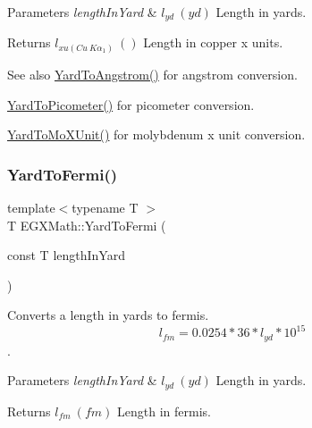 \begin{DoxyParams}{Parameters}
{\em length\+In\+Yard} & $ l_{yd}\ (yd)$ Length in yards. \\
\hline
\end{DoxyParams}
\begin{DoxyReturn}{Returns}
$ l_{xu(Cu\ K\alpha_1)}\ ()$ Length in copper x units. 
\end{DoxyReturn}
\begin{DoxySeeAlso}{See also}
\mbox{\hyperlink{group___e_g_x_math-_conversions-_length_conversions-_imperial-_yard-_non-_s_i_gaacff083bdc6b954da2e4b63f857cb429}{Yard\+To\+Angstrom()}} for angstrom conversion. 

\mbox{\hyperlink{group___e_g_x_math-_conversions-_length_conversions-_imperial-_yard-_s_i_ga1d0bc498fe3ed1693555aa6917abb758}{Yard\+To\+Picometer()}} for picometer conversion. 

\mbox{\hyperlink{group___e_g_x_math-_conversions-_length_conversions-_imperial-_yard-_non-_s_i_ga81f1fa776a2154865e8ee4be46ef693d}{Yard\+To\+Mo\+X\+Unit()}} for molybdenum x unit conversion. 
\end{DoxySeeAlso}
\mbox{\label{group___e_g_x_math-_conversions-_length_conversions-_imperial-_yard-_non-_s_i_ga796a8607338fefb728574de07375543f}} 
\subsubsection{\texorpdfstring{Yard\+To\+Fermi()}{YardToFermi()}}
{\footnotesize\ttfamily template$<$typename T $>$ \\
T E\+G\+X\+Math\+::\+Yard\+To\+Fermi (\begin{DoxyParamCaption}\item[{const T}]{length\+In\+Yard }\end{DoxyParamCaption})}



Converts a length in yards to fermis. \[ l_{fm}=0.0254 * 36 * l_{yd} * 10^{15} \]. 


\begin{DoxyParams}{Parameters}
{\em length\+In\+Yard} & $ l_{yd}\ (yd)$ Length in yards. \\
\hline
\end{DoxyParams}
\begin{DoxyReturn}{Returns}
$ l_{fm}\ (fm)$ Length in fermis. 
\end{DoxyReturn}
\mbox{\label{group___e_g_x_math-_conversions-_length_conversions-_imperial-_yard-_non-_s_i_ga7d167f52b344853fd58dcc589e0ad301}} 
